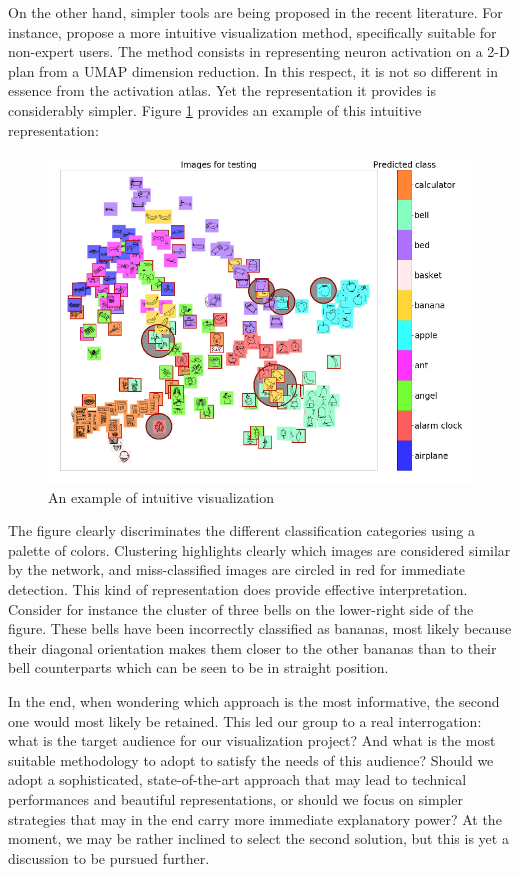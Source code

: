 On the other hand, simpler tools are being proposed in the recent literature. For instance, \cite{Peters2018} propose a more intuitive visualization method, specifically suitable for non-expert users. The method consists in representing neuron activation on a 2-D plan from a UMAP dimension reduction. In this respect, it is not so different in essence from the activation atlas. Yet the representation it provides is considerably simpler. Figure \ref{im_sec4_2} provides an example of this intuitive representation:

\begin{figure}[H]
	\centering
	\includegraphics[width=\linewidth]{images/image5.png}
	\caption{An example of intuitive visualization}
	\label{im_sec4_2}
\end{figure}

The figure clearly discriminates the different classification categories using a palette of colors. Clustering highlights clearly which images are considered similar by the network, and miss-classified images are circled in red for immediate detection. This kind of representation does provide effective interpretation. Consider for instance the cluster of three bells on the lower-right side of the figure. These bells have been incorrectly classified as bananas, most likely because their diagonal orientation makes them closer to the other bananas than to their bell counterparts which can be seen to be in straight position.

In the end, when wondering which approach is the most informative, the second one would most likely be retained. This led our group to a real interrogation: what is the target audience for our visualization project? And what is the most suitable methodology to adopt to satisfy the needs of this audience? Should we adopt a sophisticated, state-of-the-art approach that may lead to technical performances and beautiful representations, or should we focus on simpler strategies that may in the end carry more immediate explanatory power? At the moment, we may be rather inclined to select the second solution, but this is yet a discussion to be pursued further.


